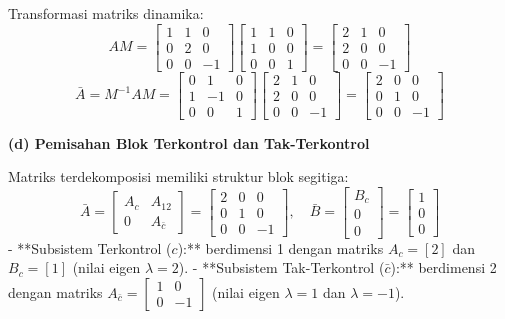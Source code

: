 \documentclass[11pt,a4paper]{article}
\begin{document}
Transformasi matriks dinamika:
$$A M = \begin{bmatrix} 1 & 1 & 0 \\ 0 & 2 & 0 \\ 0 & 0 & -1 \end{bmatrix} \begin{bmatrix} 1 & 1 & 0 \\ 1 & 0 & 0 \\ 0 & 0 & 1 \end{bmatrix} = \begin{bmatrix} 2 & 1 & 0 \\ 2 & 0 & 0 \\ 0 & 0 & -1 \end{bmatrix}$$
$$\bar{A} = M^{-1} A M = \begin{bmatrix} 0 & 1 & 0 \\ 1 & -1 & 0 \\ 0 & 0 & 1 \end{bmatrix} \begin{bmatrix} 2 & 1 & 0 \\ 2 & 0 & 0 \\ 0 & 0 & -1 \end{bmatrix} = \begin{bmatrix} 2 & 0 & 0 \\ 0 & 1 & 0 \\ 0 & 0 & -1 \end{bmatrix}$$

\textbf{(d) Pemisahan Blok Terkontrol dan Tak-Terkontrol}

Matriks terdekomposisi memiliki struktur blok segitiga:
$$\bar{A} = \begin{bmatrix} A_c & A_{12} \\ 0 & A_{\bar{c}} \end{bmatrix} = \begin{bmatrix} 2 & 0 & 0 \\ \hline 0 & 1 & 0 \\ 0 & 0 & -1 \end{bmatrix}, \quad \bar{B} = \begin{bmatrix} B_c \\ \hline 0 \\ 0 \end{bmatrix} = \begin{bmatrix} 1 \\ \hline 0 \\ 0 \end{bmatrix}$$
- **Subsistem Terkontrol ($c$):** berdimensi 1 dengan matriks $A_c = [2]$ dan $B_c = [1]$ (nilai eigen $\lambda = 2$).
- **Subsistem Tak-Terkontrol ($\bar{c}$):** berdimensi 2 dengan matriks $A_{\bar{c}} = \begin{bmatrix} 1 & 0 \\ 0 & -1 \end{bmatrix}$ (nilai eigen $\lambda = 1$ dan $\lambda = -1$).
\end{document}
